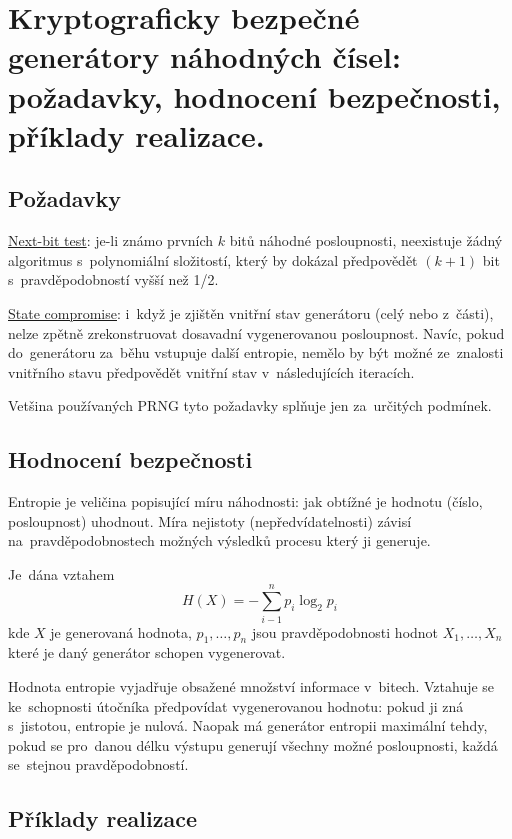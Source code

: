 \clearpage
\section{Kryptograficky bezpečné generátory náhodných čísel: požadavky, hodnocení bezpečnosti, příklady realizace.}

\subsection{Požadavky}

\uline{Next-bit test}: je-li známo prvních $k$ bitů náhodné posloupnosti, neexistuje žádný algoritmus s~polynomiální složitostí, který by dokázal předpovědět $(k + 1)$ bit s~pravděpodobností vyšší než 1/2.

\uline{State compromise}: i~když je zjištěn vnitřní stav generátoru (celý nebo z~části), nelze zpětně zrekonstruovat dosavadní vygenerovanou posloupnost.
Navíc, pokud do~generátoru za~běhu vstupuje další entropie, nemělo by být možné ze~znalosti vnitřního stavu předpovědět vnitřní stav v~následujících iteracích.

Vetšina používaných PRNG tyto požadavky splňuje jen za~určitých podmínek.

\subsection{Hodnocení bezpečnosti}

Entropie je veličina popisující míru náhodnosti: jak obtížné je hodnotu (číslo, posloupnost) uhodnout.
Míra nejistoty (nepředvídatelnosti) závisí na~pravděpodobnostech možných výsledků procesu který ji generuje.

Je~dána vztahem
$$H(X) = -\sum_{i-1}^n p_{i} \log_2 p_{i}$$
kde
$X$ je generovaná hodnota,
$p_1, \dots, p_n$ jsou pravděpodobnosti hodnot $X_1, \dots, X_n$ které je daný generátor schopen vygenerovat.

Hodnota entropie vyjadřuje obsažené množství informace v~bitech.
Vztahuje se ke~schopnosti útočníka předpovídat vygenerovanou hodnotu: pokud ji zná s~jistotou, entropie je nulová.
Naopak má generátor entropii maximální tehdy, pokud se pro~danou délku výstupu generují všechny možné posloupnosti, každá se~stejnou pravděpodobností.



\subsection{Příklady realizace}

